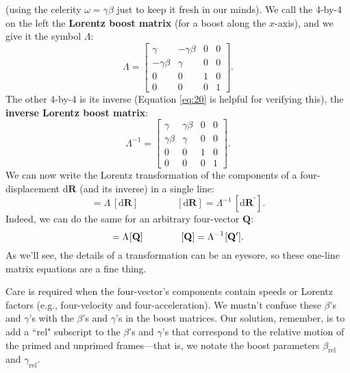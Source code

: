 \documentclass[12pt]{article}
\renewcommand{\vv}[1]{\mathbf{#1}}
\newcommand{\dd}[1]{\mathrm{d}#1}
\begin{document}
(using the celerity $\omega = \gamma \beta$ just to keep it fresh in our minds). We call the 4-by-4 on the left the \textbf{Lorentz boost matrix} (for a boost along the $x$-axis), and we give it the symbol $\Lambda$:
\begin{equation}\label{eq:bm}
\Lambda =
\begin{bmatrix}
\gamma & -\gamma \beta & 0 & 0 \\
- \gamma \beta & \gamma & 0 & 0 \\
0 & 0 & 1 & 0 \\
0 & 0 & 0 & 1
\end{bmatrix} .
\end{equation}
The other 4-by-4 is its inverse (Equation \ref{eq:20} is helpful for verifying this), the \textbf{inverse Lorentz boost matrix}:
\begin{equation}\label{eq:im}
\Lambda^{-1} =
\begin{bmatrix}
\gamma & \gamma \beta & 0 & 0 \\
\gamma \beta & \gamma & 0 & 0 \\
0 & 0 & 1 & 0 \\
0 & 0 & 0 & 1
\end{bmatrix} .
\end{equation}
We can now write the Lorentz transformation of the components of a four-displacement $\dd \vv R$ (and its inverse) in a single line:
\begin{equation*}
[\dd \vv R^\prime] = \Lambda \, [\dd \vv R] \qquad \qquad [\dd \vv R] = \Lambda^{-1} \, [\dd \vv R^\prime] .
\end{equation*}
Indeed, we can do the same for an arbitrary four-vector $\vv Q$:
\begin{equation*}
[\vv Q^\prime] = \Lambda \mkern1mu [\vv Q] \qquad \qquad [\vv Q] = \Lambda^{-1} \mkern1mu [\vv Q^\prime] .
\end{equation*}
As we'll see, the details of a transformation can be an eyesore, so these one-line matrix equations are a fine thing.

Care is required when the four-vector's components contain speeds or Lorentz factors (e.g., four-velocity and four-acceleration). We mustn't confuse these $\beta$'s and $\gamma$'s with the $\beta$'s and $\gamma$'s in the boost matrices. Our solution, remember, is to add a ``rel" subscript to the $\beta$'s and $\gamma$'s that correspond to the relative motion of the primed and unprimed frames---that is, we notate the boost parameters $\beta_{\mathrm{rel}}$ and $\gamma_{\mathrm{rel}}$.
\end{document}
